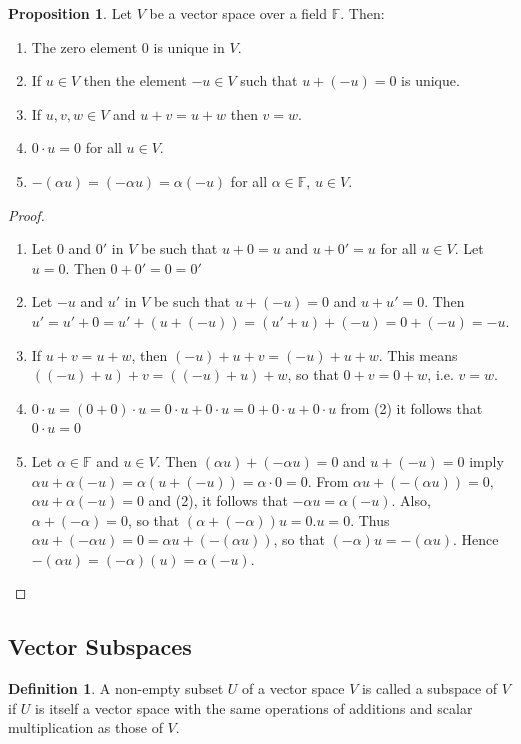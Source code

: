 \documentclass[11pt,a4paper]{article}
\theoremstyle{definition}
\newtheorem{defn}[thm]{Definition}
\newtheorem{prop}[thm]{Proposition}
\begin{document}
\begin{prop}
Let $V$ be a vector space over a field $\mathbb{F}$. Then:
\begin{enumerate}
\item The zero element $0$ is unique in $V$.
\item If $u\in V$ then the element $-u\in V$ such that $u+(-u)=0$ is unique.
\item If $u,v,w\in V$ and $u+v=u+w$ then $v=w$.
\item $0\cdot u=0$ for all $u\in V$.
\item $-(\alpha u)=(-\alpha u)=\alpha (-u)$ for all $\alpha \in \mathbb{F}$, $u\in V$.
\end{enumerate}
\end{prop}

\begin{proof}
\begin{enumerate}
\item Let $0$ and $0'$ in $V$ be such that $u+0=u$ and $u+0'=u$ for all $u\in V$. Let $u=0$. Then $0+0'=0=0'$
\item Let $-u$ and $u'$ in $V$ be such that $u+(-u)=0$ and $u+u'=0$. Then $u'=u'+0=u'+(u+(-u))=(u'+u)+(-u)=0+(-u)=-u$.
\item If $u+v=u+w$, then $(-u)+u+v=(-u)+u+w$. This means $((-u)+u)+v=((-u)+u)+w$, so that $0+v=0+w$, i.e. $v=w$.
\item $0\cdot u=(0+0)\cdot u=0\cdot u+0\cdot u=0+0\cdot u+0\cdot u$ from (2) it follows that $0\cdot u=0$
\item Let $\alpha \in \mathbb{F}$ and $u\in V$. Then $(\alpha u)+(-\alpha u)=0$ and $u+(-u)=0$ imply $\alpha u+\alpha (-u)=\alpha (u+(-u))=\alpha\cdot 0=0$. From $\alpha u+(-(\alpha u))=0,$ $\alpha u+\alpha (-u)=0$ and (2), it follows that $-\alpha u=\alpha (-u).$ Also, $\alpha +(-\alpha)=0$, so that $(\alpha +(-\alpha))u=0.u=0$. Thus $\alpha u +(-\alpha u)=0=\alpha u+(-(\alpha u))$, so that $(-\alpha)u=-(\alpha u)$. Hence $-(\alpha u)=(-\alpha)(u)=\alpha (-u)$.
\end{enumerate}
\end{proof}


\subsection{Vector Subspaces}
\begin{defn}
A non-empty subset $U$ of a vector space $V$ is called a subspace of $V$ if $U$ is itself a vector space with the same operations of additions and scalar multiplication as those of $V$.
\end{defn}
\end{document}
